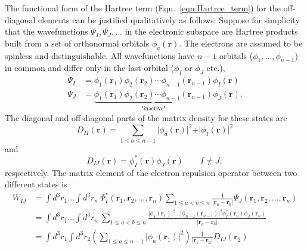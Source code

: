 \documentclass[journal=jpclcd,manuscript=letter]{achemso}
\renewcommand\vec[1]{\mathbf{#1}}
\begin{document}
The functional form of the Hartree term (Eqn.~\ref{eqn:Hartree_term}) for the off-diagonal elements
can be justified qualitatively as follows:
Suppose for simplicity that the wavefunctions $\Psi_{I},\Psi_{J},\ldots$
in the electronic subspace are Hartree products built from a set of orthonormal orbitals $\phi_{a}(\vec{r})$.
The electrons are assumed to be spinless and distinguishable.
All wavefunctions have $n-1$ orbitals ($\phi_1,\ldots,\phi_{n-1}$) in common
and differ only in the last orbital ($\phi_I$ or $\phi_J$ etc.),
\begin{align}
 \Psi_I &= \phi_1(\vec{r}_1) \phi_2(\vec{r}_2) \cdots \phi_{n-1}(\vec{r}_{n-1}) \phi_{I}(\vec{r}) \\
 \Psi_J &= \underbrace{\phi_1(\vec{r}_1) \phi_2(\vec{r}_2) \cdots \phi_{n-1}(\vec{r}_{n-1})}_{\text{"inactive"}} \phi_{J}(\vec{r}).
\end{align}
The diagonal and off-diagonal parts of the matrix density for these states are
\begin{equation}
 D_{II}(\vec{r}) = \sum_{1 \leq a \leq n-1} \vert \phi_a(\vec{r}) \vert^2 + \vert \phi_I(\vec{r}) \vert^2
\end{equation}
and
\begin{equation}
  D_{IJ}(\vec{r}) = \phi^*_I(\vec{r}) \phi_J(\vec{r}) \quad \quad I \neq J,
\end{equation}
respectively. The matrix element of the electron repulsion operator between two different states is
\begin{equation}
  \begin{split}
W_{IJ} &= \int d^3r_1 \ldots \int d^3r_n ~ 
\Psi^*_{I}(\vec{r}_1,\vec{r}_2,\ldots,\vec{r}_n)
\sum_{1 \leq a < b \leq n} \frac{1}{\vert \vec{r}_a - \vec{r}_b \vert}
\Psi_{J}(\vec{r}_1,\vec{r}_2,\ldots,\vec{r}_n) \\
&= \int d^3r_1 \ldots \int d^3r_n ~ 
\sum_{1 \leq a < b \leq n} \frac{
  \vert \phi_1(\vec{r}_1) \vert^2 \ldots \vert \phi_{n-1}(\vec{r}_{n-1}) \vert^2 \phi^*_I(\vec{r}_n) \phi_J(\vec{r}_n)
  }{\vert \vec{r}_a - \vec{r}_b \vert} \\
&= \int d^3r_1 \int d^3r_2 \left(\sum_{1 \leq a \leq n-1} \vert \phi_a(\vec{r}_1) \vert^2 \right)
  \frac{1}{\vert \vec{r}_1 - \vec{r}_2 \vert}
  D_{IJ}(\vec{r}_2) \label{eqn:Hartree_exact_electron_repulsion}
  \end{split}
\end{equation}
\end{document}
